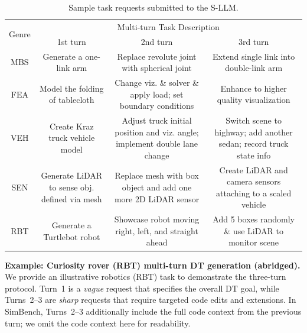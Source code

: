 \begin{table}[h!]
	\centering
	\begin{tabular}{|c|c|c|c|}
		\hline
		\multirow{2}{0.7cm}{Genre} & \multicolumn{3}{c|}{Multi-turn Task Description}  \\ \cline{2-4}
		& 1st turn & 2nd turn & 3rd turn   \\ \hline
		\parbox[c][1.75cm][c]{0.7cm}{MBS} & \parbox[c][1.75cm][c]{1.5cm}{Generate a one-link arm} & \parbox[c][1.75cm][c]{2.1cm}{Replace revolute joint with spherical joint} & \parbox[c][1.75cm][c]{2.1cm}{Extend single link into double-link arm}  \\ \hline
		\parbox[c][2cm][c]{0.7cm}{FEA} & \parbox[c][2cm][c]{1.5cm}{Model the folding of tablecloth} & \parbox[c][2cm][c]{2.1cm}{Change viz. \& solver \& apply load; set boundary conditions} & \parbox[c][2cm][c]{2.1cm}{Enhance to higher quality visualization}  \\ \hline
		\parbox[c][2.5cm][c]{0.7cm}{VEH} & \parbox[c][2.5cm][c]{1.5cm}{Create Kraz truck vehicle model} & \parbox[c][2.5cm][c]{2.1cm}{Adjust truck initial position and viz. angle; implement double lane change} & \parbox[c][2.5cm][c]{2.1cm}{Switch scene to highway; add another sedan; record truck state info}  \\ \hline
		\parbox[c][2cm][c]{0.7cm}{SEN} & \parbox[c][2cm][c]{1.5cm}{Generate LiDAR to sense obj. defined via mesh} & \parbox[c][2cm][c]{2.1cm}{Replace mesh with box object and add one more 2D LiDAR sensor} & \parbox[c][2cm][c]{2.1cm}{Create LiDAR and camera sensors attaching to a scaled vehicle}  \\ \hline
		\parbox[c][1.75cm][c]{0.7cm}{RBT} & \parbox[c][1.75cm][c]{1.5cm}{Generate a Turtlebot robot} & \parbox[c][1.75cm][c]{2.1cm}{Showcase robot moving right, left, and straight ahead} & \parbox[c][1.75cm][c]{2.1cm}{Add 5 boxes randomly \& use LiDAR to monitor scene}  \\ \hline
	\end{tabular}
	\caption{Sample task requests submitted to the S-LLM.}
	\vspace{-10pt}
	\label{tab:mt_bench_sample}
\end{table}


\medskip
\noindent\textbf{Example: Curiosity rover (RBT) multi-turn DT generation (abridged).}
\label{app:curiosity_example}
We provide an illustrative robotics (RBT) task to demonstrate the three-turn protocol.
Turn~1 is a \emph{vague} request that specifies the overall DT goal, while Turns~2--3 are \emph{sharp} requests that require targeted code edits and extensions.
In SimBench, Turns~2--3 additionally include the full code context from the previous turn; we omit the code context here for readability.

